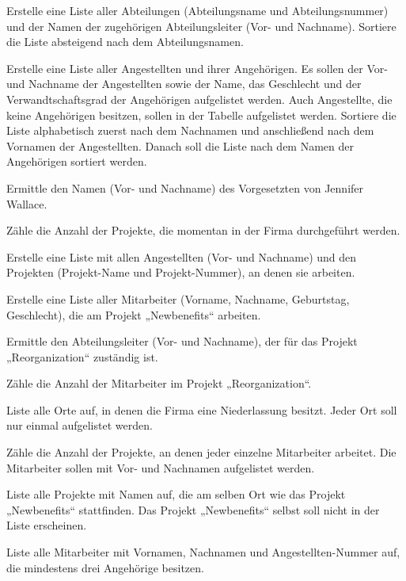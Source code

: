 \begin{compactenum}[a)] 
\item Erstelle eine Liste aller Abteilungen (Abteilungsname und
Abteilungsnummer) und der Namen der zugehörigen Abteilungsleiter (Vor- und
Nachname). Sortiere die Liste absteigend nach dem Abteilungsnamen.

\item Erstelle eine Liste aller Angestellten und ihrer Angehörigen. Es sollen
der Vor- und Nachname der Angestellten sowie der Name, das Geschlecht und der
Verwandtschaftsgrad der Angehörigen aufgelistet werden. Auch Angestellte, die
keine Angehörigen besitzen, sollen in der Tabelle aufgelistet werden.
Sortiere die Liste alphabetisch zuerst nach dem Nachnamen und anschließend nach
dem Vornamen der Angestellten. Danach soll die Liste nach dem Namen der
Angehörigen sortiert werden.

\item Ermittle den Namen (Vor- und Nachname) des Vorgesetzten von Jennifer
Wallace.

\item Zähle die Anzahl der Projekte, die momentan in der Firma durchgeführt
werden.

\item Erstelle eine Liste mit allen Angestellten (Vor- und Nachname) und den
Projekten (Projekt-Name und Projekt-Nummer), an denen sie arbeiten.

\item Erstelle eine Liste aller Mitarbeiter (Vorname, Nachname, Geburtstag,
Geschlecht), die am Projekt „Newbenefits“ arbeiten.

\item Ermittle den Abteilungsleiter (Vor- und Nachname), der für das Projekt
„Reorganization“ zuständig ist.

\item Zähle die Anzahl der Mitarbeiter im Projekt „Reorganization“.

\item Liste alle Orte auf, in denen die Firma eine Niederlassung besitzt. Jeder
Ort soll nur einmal aufgelistet werden.

\item Zähle die Anzahl der Projekte, an denen jeder einzelne Mitarbeiter
arbeitet. Die Mitarbeiter sollen mit Vor- und Nachnamen aufgelistet werden.

\item Liste alle Projekte mit Namen auf, die am selben Ort wie das Projekt
„Newbenefits“ stattfinden. Das Projekt „Newbenefits“ selbst soll nicht in der
Liste erscheinen.

\item Liste alle Mitarbeiter mit Vornamen, Nachnamen und Angestellten-Nummer
auf, die mindestens drei Angehörige besitzen.
\end{compactenum}